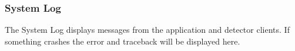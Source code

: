 \subsubsection{System Log}
The System Log displays messages from the application and detector clients. If something crashes the error and traceback will be displayed here.